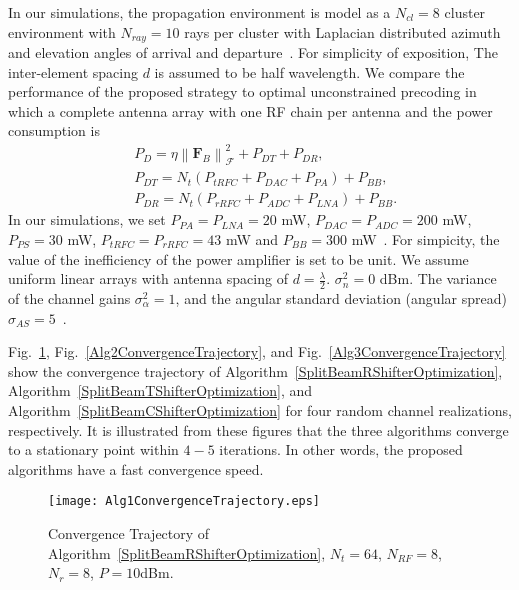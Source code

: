 \documentclass[11pt,draftcls,onecolumn]{IEEEtran}
\begin{document}
In our simulations, the propagation environment is model as a $N_{cl} = 8$ cluster environment with $N_{ray} = 10$ rays per cluster with Laplacian distributed azimuth and elevation angles of arrival and departure~\cite{TVTForenza2007,JSACXu2002}. For simplicity of exposition, The inter-element spacing $d$ is assumed to be half wavelength. We compare the performance of the proposed strategy to optimal unconstrained precoding in which a complete antenna array with one RF chain per antenna and the power consumption is
\begin{subequations}\label{SplitBeam29}
\begin{align}
&P_{D}=\eta\left\|\bm{F}_{B}\right\|_{\mathcal{F}}^{2}+P_{DT}+P_{DR},\\
&P_{DT}=N_{t}\left(P_{tRFC}+P_{DAC}+P_{PA}\right)+P_{BB},\\
&P_{DR}=N_{t}\left(P_{rRFC}+P_{ADC}+P_{LNA}\right)+P_{BB}.
\end{align}
\end{subequations}
In our simulations, we set $P_{PA}=P_{LNA} = 20$ mW, $P_{DAC}=P_{ADC} = 200$ mW, $P_{PS} = 30$ mW, $P_{tRFC}=P_{rRFC}= 43$ mW and $P_{BB}=300$ mW~\cite{CTWRangan2013,IJSSCYu2010,TMTTLi2013}. For simpicity, the value of the inefficiency of the power amplifier is set to be unit. We assume uniform linear arrays with antenna spacing of $d=\frac{\lambda}{2}$. $\sigma_{n}^{2} =0$ dBm. The variance of the channel
gains $\sigma_{\alpha}^{2}=1$, and the angular standard deviation (angular spread)
 $\sigma_{AS}= 5$~\cite{TWCAyach2014,JSTSPAlk2014,TWCAlk2015,TSPLee2015,TVTKim2015}.


Fig.~\ref{Alg1ConvergenceTrajectory}, Fig.~\ref{Alg2ConvergenceTrajectory}, and Fig.~\ref{Alg3ConvergenceTrajectory} show the convergence trajectory of Algorithm~\ref{SplitBeamRShifterOptimization}, Algorithm~\ref{SplitBeamTShifterOptimization}, and Algorithm~\ref{SplitBeamCShifterOptimization} for four random channel realizations, respectively. It is illustrated from these figures that the three algorithms converge to a stationary point within $4-5$ iterations. In other words, the proposed algorithms have a fast convergence speed.
\begin{figure}[h]%
\centering
{}
\onelinecaptionstrue
\texttt{[image: Alg1ConvergenceTrajectory.eps]}\\
\caption{Convergence Trajectory of Algorithm~\ref{SplitBeamRShifterOptimization}, $N_{t}=64$, $N_{RF}=8$, $N_{r}=8$, $P=10$dBm.}
\label{Alg1ConvergenceTrajectory}
\end{figure}
\end{document}
